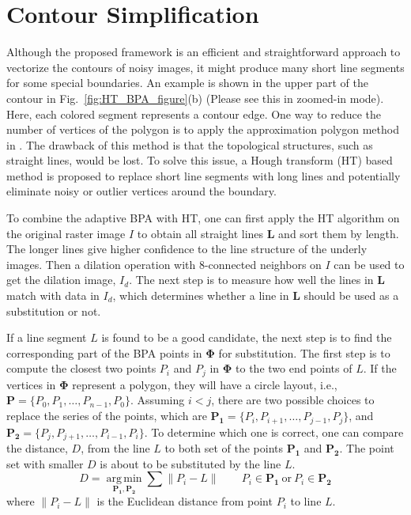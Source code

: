 \documentclass{article}
\newcommand{\Figb}[1]{Fig.~\ref{fig:#1}(b)}
\begin{document}
\section{Contour Simplification}
\label{sec:BPA_HT}

Although the proposed framework is an efficient and straightforward approach to
vectorize the contours of noisy images,
it might produce many short line segments for some special boundaries. An example
is shown in the upper part of the contour in \Figb{HT_BPA_figure} (Please see this
in zoomed-in mode). Here, each colored segment represents a contour edge.
One way to reduce the number of vertices of the polygon is to apply
the approximation polygon method in \cite{DP_AV}. The drawback of this
method is that the topological structures, such as straight lines, would be lost.
To solve this issue, a Hough transform (HT) based method is proposed to replace
short line segments with long lines and potentially eliminate noisy
or outlier vertices around the boundary.

To combine the adaptive BPA with HT, one can first apply the HT algorithm on the
original raster image $I$ to obtain all straight lines $\boldsymbol{L}$ and sort them by length.
The longer lines give higher confidence to the line structure of the underly images.
Then a dilation operation with 8-connected neighbors on $I$ can be used to get the dilation image, $I_d$.
The next step is to measure how well the lines in $\boldsymbol{L}$ match with
data in $I_d$, which determines whether a line in $\boldsymbol{L}$
should be used as a substitution or not.

If a line segment $L$ is found to be a good candidate, the next step is to
find the corresponding part of the BPA points in $\boldsymbol{\Phi}$ for
substitution. The first step is to compute the closest two points
$P_i$ and $P_j$ in $\boldsymbol{\Phi}$ to the two end points of $L$.
If the vertices in $\boldsymbol{\Phi}$ represent a polygon, they will have
a circle layout, i.e., $\boldsymbol{P} = \{ P_0,P_1,\ldots ,P_{n-1}, P_0 \}$.
Assuming $i < j$, there are two possible choices to replace
the series of the points, which are
$\boldsymbol{P_1} = \{ P_i,P_{i+1},\ldots,P_{j-1}, P_j \}$, and
$\boldsymbol{P_2} = \{ P_j,P_{j+1},\ldots,P_{i-1}, P_i \}$.
To determine which one is correct, one can compare the distance, $D$,
from the line $L$ to both set of the points $\boldsymbol{P_1}$ and
$\boldsymbol{P_2}$.
The point set with smaller $D$ is about to be substituted by the line $L$.
\begin{equation*}
D = \underset{\boldsymbol{P_1},\boldsymbol{P_2}}{\operatorname{arg\,min}}\sum{\lVert P_i - L \rVert}
\qquad P_i \in \boldsymbol{P_1} \ \text{or} \ P_i \in \boldsymbol{P_2}
\end{equation*}
where $\lVert P_i - L \rVert$ is the Euclidean distance from point $P_i$ to
line $L$.
\end{document}
